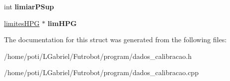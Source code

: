 \begin{DoxyCompactItemize}
\item 
int {\bfseries limiar\+P\+Sup}\hypertarget{structPARAMETROS__CALIBRACAO_a30cd144c7633aea225dc3cba93781aae}{}\label{structPARAMETROS__CALIBRACAO_a30cd144c7633aea225dc3cba93781aae}

\item 
\hyperlink{structlimitesHPG}{limites\+H\+PG} $\ast$ {\bfseries lim\+H\+PG}\hypertarget{structPARAMETROS__CALIBRACAO_a8cb9b7426892baac098c3a35fc0aa308}{}\label{structPARAMETROS__CALIBRACAO_a8cb9b7426892baac098c3a35fc0aa308}

\end{DoxyCompactItemize}


The documentation for this struct was generated from the following files\+:\begin{DoxyCompactItemize}
\item 
/home/poti/\+L\+Gabriel/\+Futrobot/program/dados\+\_\+calibracao.\+h\item 
/home/poti/\+L\+Gabriel/\+Futrobot/program/dados\+\_\+calibracao.\+cpp\end{DoxyCompactItemize}
